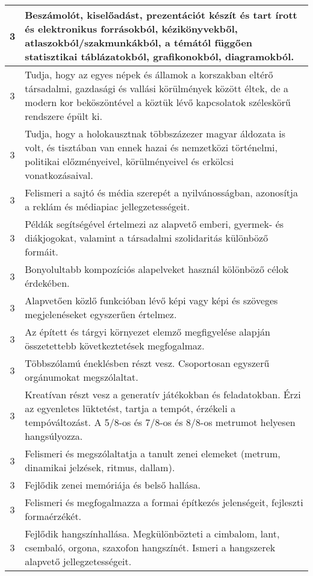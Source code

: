 \begin{longtable}{c | p{12cm} }
                                
                                          3 &  Beszámolót, kiselőadást, prezentációt készít és tart írott és elektronikus forrásokból, kézikönyvekből, atlaszokból/szakmunkákból, a témától függően statisztikai táblázatokból, grafikonokból, diagramokból. \\ \hline
                                          3 &  Tudja, hogy az egyes népek és államok a korszakban eltérő társadalmi, gazdasági és vallási körülmények között éltek, de a modern kor beköszöntével a köztük lévő kapcsolatok széleskörű rendszere épült ki. \\ \hline
                                          3 &  Tudja, hogy a holokausztnak többszázezer magyar áldozata is volt, és  tisztában van ennek hazai és nemzetközi történelmi, politikai előzményeivel, körülményeivel és erkölcsi vonatkozásaival. \\ \hline
                                          3 &  Felismeri a sajtó és média szerepét a nyilvánosságban, azonosítja a reklám és médiapiac jellegzetességeit. \\ \hline
                                          3 &  Példák segítségével értelmezi az alapvető emberi, gyermek- és diákjogokat, valamint a társadalmi szolidaritás különböző formáit. \\ \hline
                                          3 &  Bonyolultabb kompozíciós alapelveket használ kölönböző célok érdekében. \\ \hline
                                          3 &  Alapvetően közlő funkcióban lévő képi vagy képi és szöveges megjelenéseket egyszerűen értelmez. \\ \hline
                                          3 &  Az épített és tárgyi környezet elemző megfigyelése alapján összetettebb következtetések megfogalmaz. \\ \hline
                                          3 &  Többszólamú éneklésben részt vesz. Csoportosan egyszerű orgánumokat megszólaltat. \\ \hline
                                          3 &  Kreatívan  részt vesz a generatív játékokban és feladatokban. Érzi az egyenletes lüktetést, tartja a tempót, érzékeli a tempóváltozást. A 5/8-os és 7/8-os és 8/8-os metrumot helyesen hangsúlyozza. \\ \hline
                                          3 &  Felismeri és megszólaltatja a tanult zenei elemeket (metrum, dinamikai jelzések, ritmus, dallam). \\ \hline
                                          3 &  Fejlődik zenei memóriája és belső hallása. \\ \hline
                                          3 &  Felismeri és megfogalmazza a formai építkezés jelenségeit, fejleszti formaérzékét. \\ \hline
                                          3 &  Fejlődik hangszínhallása. Megkülönbözteti a cimbalom, lant, csembaló, orgona, szaxofon hangszínét. Ismeri a hangszerek alapvető jellegzetességeit. \\ \hline
                                      

\end{longtable}
